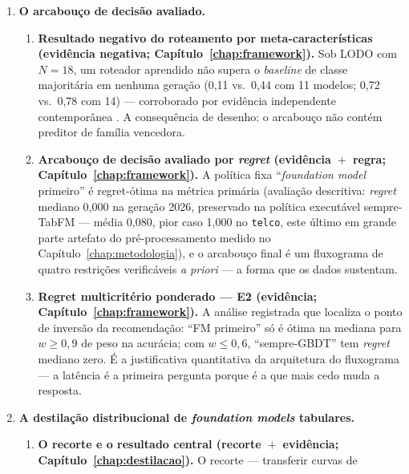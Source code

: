 \begin{enumerate}
\begin{enumerate}
    KAN de \citet{poeta2024}, obtido sem \emph{baselines} GBDT e sob
    treino curto, que o protocolo uniforme não reproduz; a contraparte registrada é que ambas são
    baratas de servir (2,3--3,1~\us/linha) --- o problema é desempenho,
    não custo.
  \end{enumerate}
  \item \textbf{O arcabouço de decisão avaliado.}
  \begin{enumerate}
  \item \textbf{Resultado negativo do roteamento por meta-características
    (evidência negativa; Capítulo~\ref{chap:framework}).} Sob LODO com
    $N{=}18$, um roteador aprendido não supera o \emph{baseline} de
    classe majoritária em nenhuma geração (0,11 vs.\ 0,44 com 11
    modelos; 0,72 vs.\ 0,78 com 14) --- corroborado por evidência
    independente contemporânea \citep{herre2026}. A consequência de
    desenho: o arcabouço não contém preditor de família vencedora.
  \item \textbf{Arcabouço de decisão avaliado por \emph{regret}
    (evidência~$+$~regra; Capítulo~\ref{chap:framework}).} A política
    fixa ``\emph{foundation model} primeiro'' é regret-ótima na métrica
    primária (avaliação descritiva: \emph{regret} mediano 0,000 na
    geração 2026,
    preservado na política executável sempre-TabFM --- média 0,080,
    pior caso 1,000 no \texttt{telco}, este último em grande parte
    artefato do pré-processamento medido no
    Capítulo~\ref{chap:metodologia}), e o
    arcabouço final é um fluxograma de quatro restrições verificáveis
    \emph{a priori} --- a forma que os dados sustentam.
  \item \textbf{Regret multicritério ponderado --- E2 (evidência;
    Capítulo~\ref{chap:framework}).} A
    análise registrada que localiza o ponto de inversão da
    recomendação: ``FM primeiro'' só é ótima na mediana para
    $w \geq 0{,}9$ de peso na acurácia; com $w \leq 0{,}6$,
    ``sempre-GBDT'' tem \emph{regret} mediano zero. É a justificativa
    quantitativa da arquitetura do fluxograma --- a latência é a
    primeira pergunta porque é a que mais cedo muda a resposta.
  \end{enumerate}
  \item \textbf{A destilação distribucional de \emph{foundation
    models} tabulares.}
  \begin{enumerate}
  \item \textbf{O recorte e o resultado central (recorte~$+$~evidência;
    Capítulo~\ref{chap:destilacao}).} O recorte --- transferir curvas de

\end{enumerate}
\end{enumerate}
